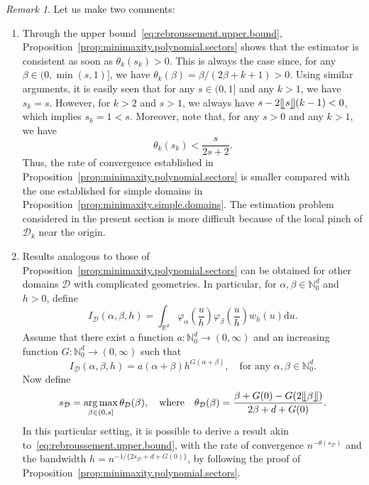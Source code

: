 \documentclass[bj,authoryear]{imsart}
\numberwithin{equation}{section}
\theoremstyle{plain}
\theoremstyle{remark}
\newtheorem{remark}{Remark}
\newcommand{\R}{\mathbb{R}}
\newcommand{\1}{\mathds{1}}
\newcommand{\rd}{\mathrm{d}}
\newcommand{\domain}{\mathcal{D}}
\begin{document}
    \newpage
    \begin{remark}\label{rem:other.complicated.domains}\upshape
        Let us make two comments:
        \begin{enumerate}
            \item Through the upper bound~\eqref{eq:rebroussement.upper.bound}, Proposition~\ref{prop:minimaxity.polynomial.sectors} shows that the estimator is consistent as soon as $\theta_k(s_k)>0$. This is always the case since, for any $\beta\in (0,\min(s,1)]$, we have $\theta_k(\beta) = \beta/(2\beta+k+1) >0$. Using similar arguments, it is easily seen that for any $s\in (0,1]$ and any $k>1$, we have $s_k = s$. However, for $k>2$ and $s>1$, we always have $s-2\llfloor s \rrfloor(k-1) < 0$, which implies $s_k = 1 < s$. Moreover, note that, for any $s>0$ and any $k>1$, we have
                \begin{equation*}
                    \theta_k(s_k) < \frac{s}{2s+2}.
                \end{equation*}
                Thus, the rate of convergence established in Proposition~\ref{prop:minimaxity.polynomial.sectors} is smaller compared with the one established for simple domains in Proposition~\ref{prop:minimaxity.simple.domains}. The estimation problem considered in the present section is more difficult because of the local pinch of $\domain_k$ near the origin.
            \item Results analogous to those of Proposition~\ref{prop:minimaxity.polynomial.sectors} can be obtained for other domains $\domain$ with complicated geometries.
                In particular, for $\alpha,\beta\in \mathbb{N}_0^d$ and $h>0$, define
                \begin{equation*}
                    I_{\domain}(\alpha,\beta,h)=\int_{\R^d} \varphi_{\alpha}\left(\frac{u}{h}\right)\varphi_{\beta}\left(\frac{u}{h}\right)w_h(u) \rd u.
                \end{equation*}
                Assume that there exist a function $a:\mathbb{N}_0^d\to (0,\infty)$ and an increasing function $G:\mathbb{N}_0^d\to (0,\infty)$ such that
                \begin{equation*}
                    I_{\domain}(\alpha,\beta,h)=a(\alpha+\beta)h^{G(\alpha+\beta)}, \quad \text{for any $\alpha,\beta\in \mathbb{N}_0^d$.}
                \end{equation*}
                Now define
                \begin{equation*}
                    s_{\domain} = \mathop{\mathrm{arg\,max}}_{\beta\in (0,s]} \theta_{\domain}(\beta),
                    \quad \text{where} \quad
                    \theta_{\domain}(\beta) = \frac{\beta+G(0)-G(2\llfloor\beta\rrfloor)}{2\beta+d+G(0)}.
                \end{equation*}
                In this particular setting, it is possible to derive a result akin to~\eqref{eq:rebroussement.upper.bound}, with the rate of convergence $n^{-\theta(s_{\domain})}$ and the bandwidth $h=n^{-1/\{2s_{\domain}+d+G(0)\}}$, by following the proof of Proposition~\ref{prop:minimaxity.polynomial.sectors}.
        \end{enumerate}
    \end{remark}
\end{document}
